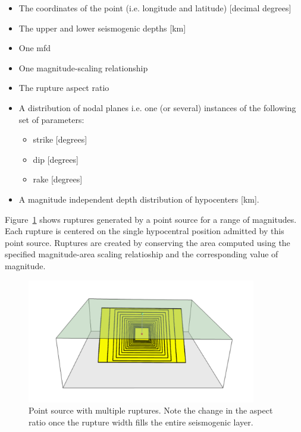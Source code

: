 \begin{itemize}

    \item The coordinates of the point (i.e. longitude and latitude) [decimal
    degrees]

    \item The upper and lower seismogenic depths [km]

    \item One \gls{mfd}

    \item One magnitude-scaling relationship

    \item The rupture aspect ratio

    \item A distribution of nodal planes i.e. one (or several) instances
    of the following set of parameters:

    \begin{itemize}
        \item \gls{strike} [degrees]
        \item \gls{dip} [degrees]
        \item \gls{rake} [degrees]
    \end{itemize}

\item A magnitude independent depth distribution of hypocenters [km].

\end{itemize}

Figure~\ref{fig:point_source_multiple_ruptures} shows ruptures generated by a
point source for a range of magnitudes. Each rupture is centered on the
single hypocentral position admitted by this point source. Ruptures are
created by conserving the area computed using the specified magnitude-area
scaling relatioship and the corresponding value of magnitude.

\begin{figure}[ht!]
\centering
\includegraphics[width=10cm]{figures/hazard/point_source_multiple_ruptures.pdf}
\caption{Point source with multiple ruptures. Note the change in the aspect
ratio once the rupture width fills the entire seismogenic layer.}
\label{fig:point_source_multiple_ruptures}
\end{figure}

